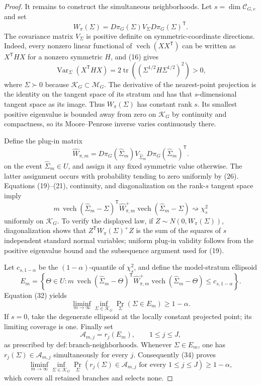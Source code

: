 \documentclass{article}
\begin{document}
\begin{proof}
It remains to construct the simultaneous neighborhoods.  Let \(s=\dim\mathcal C_{G,e}\) and set
\[
 W_\pi(\Sigma)=D\pi_G(\Sigma)V_\Sigma D\pi_G(\Sigma)^{\mathsf T}.
\tag{30}
\]
The covariance matrix \(V_\Sigma\) is positive definite on symmetric-coordinate directions.  Indeed, every nonzero linear functional of \(\operatorname{vech}(XX^{\mathsf T})\) can be written as \(X^{\mathsf T}HX\) for a nonzero symmetric \(H\), and (16) gives
\[
 \operatorname{Var}_\Sigma(X^{\mathsf T}HX)
 =2\operatorname{tr}\!\left((\Sigma^{1/2}H\Sigma^{1/2})^2\right)>0,
\tag{31}
\]
where \(\Sigma\succ0\) because \(\mathcal K_G\subset\mathcal M_G\).  The derivative of the nearest-point projection is the identity on the tangent space of its stratum and has that \(s\)-dimensional tangent space as its image.  Thus \(W_\pi(\Sigma)\) has constant rank \(s\).  Its smallest positive eigenvalue is bounded away from zero on \(\mathcal K_G\) by continuity and compactness, so its Moore--Penrose inverse varies continuously there.

Define the plug-in matrix
\[
 \widehat W_{\pi,m}
 =D\pi_G(\widehat\Sigma_m)V_{\widehat\Sigma_m}
  D\pi_G(\widehat\Sigma_m)^{\mathsf T}.
\]
on the event \(\widehat\Sigma_m\in U\), and assign it any fixed symmetric value otherwise.  The latter assignment occurs with probability tending to zero uniformly by (26).
Equations (19)--(21), continuity, and diagonalization on the rank-\(s\) tangent space imply
\[
 m\,\operatorname{vech}(\widehat\Sigma_m-\Sigma)^{\mathsf T}
 \widehat W_{\pi,m}^{+}
 \operatorname{vech}(\widehat\Sigma_m-\Sigma)
 \rightsquigarrow\chi_s^2
\tag{32}
\]
uniformly on \(\mathcal K_G\).  To verify the displayed law, if \(Z\sim N(0,W_\pi(\Sigma))\), diagonalization shows that \(Z^{\mathsf T}W_\pi(\Sigma)^+Z\) is the sum of the squares of \(s\) independent standard normal variables; uniform plug-in validity follows from the positive eigenvalue bound and the subsequence argument used for (19).

Let \(c_{s,1-\alpha}\) be the \((1-\alpha)\)-quantile of \(\chi_s^2\), and define the model-stratum ellipsoid
\[
 E_m=\left\{\Theta\in U:
 m\,\operatorname{vech}(\widehat\Sigma_m-\Theta)^{\mathsf T}
 \widehat W_{\pi,m}^{+}
 \operatorname{vech}(\widehat\Sigma_m-\Theta)
 \leq c_{s,1-\alpha}\right\}.
\tag{33}
\]
Equation (32) yields
\[
 \liminf_{m\to\infty}\inf_{\Sigma\in\mathcal K_G}
 \Pr_\Sigma(\Sigma\in E_m)\geq1-\alpha.
\tag{34}
\]
If \(s=0\), take the degenerate ellipsoid at the locally constant projected point; its limiting coverage is one.  Finally set
\[
 \mathcal A_{m,j}=r_j(E_m),\qquad 1\leq j\leq J,
\]
as prescribed by \(\mathrm{def:branch\mbox{-}neighborhoods}\).  Whenever \(\Sigma\in E_m\), one has \(r_j(\Sigma)\in\mathcal A_{m,j}\) simultaneously for every \(j\).  Consequently (34) proves
\[
 \liminf_{m\to\infty}\inf_{\Sigma\in\mathcal K_G}
 \Pr_\Sigma\!\left(r_j(\Sigma)\in\mathcal A_{m,j}
 \text{ for every }1\leq j\leq J\right)
 \geq1-\alpha,
\]
which covers all retained branches and selects none.
\end{proof}
\end{document}
